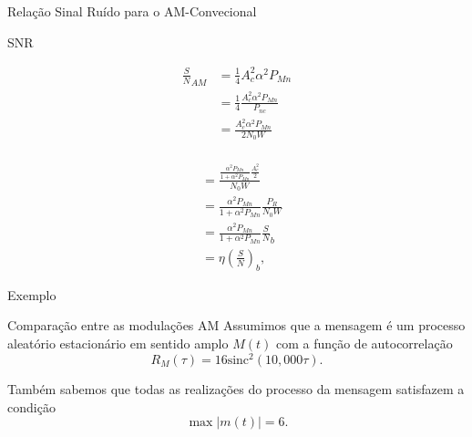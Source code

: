 \documentclass[aspectratio=169,dvipsnames]{beamer}
\begin{document}
\begin{frame}{Relação Sinal Ruído para o AM-Convecional}
    \begin{block}{SNR}
        \begin{minipage}{0.48\linewidth}
            \begin{align*}
                \frac{S}{N}_{AM} &= \frac{1}{4} A_c^2 \alpha^2 P_{Mn} \\
                &= \frac{1}{4} \frac{A_c^2 \alpha^2 P_{Mn}}{P_{nc}} \\
                &= \frac{A_c^2 \alpha^2 P_{Mn}}{2N_0W} \\
            \end{align*}
        \end{minipage}
        \hfill
        \begin{minipage}{0.48\linewidth}
            \begin{align*}
                &= \frac{\frac{\alpha^2 P_{Mn}}{1 + \alpha^2 P_{Mn}} \frac{A_c^2}{2}}{N_0W} \\
                &= \frac{\alpha^2 P_{Mn}}{1 + \alpha^2 P_{Mn}} \frac{P_R}{N_0W} \\
                &= \frac{\alpha^2 P_{Mn}}{1 + \alpha^2 P_{Mn}} \frac{S}{N}_{b} \\
                &= \eta \left( \frac{S}{N} \right)_{b},
            \end{align*}
        \end{minipage}
    \end{block}
\end{frame}


\begin{frame}{Exemplo}
    \begin{block}{Comparação entre as modulações AM}
Assumimos que a mensagem é um processo aleatório estacionário em sentido amplo \( M(t) \) com a função de autocorrelação
\[ R_M(\tau) = 16 \text{sinc}^2(10,000\tau). \]

Também sabemos que todas as realizações do processo da mensagem satisfazem a condição
\[ \max |m(t)| = 6. \]

\end{block}
\end{frame}
\end{document}
